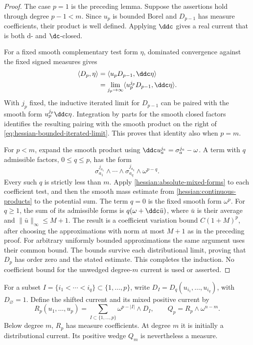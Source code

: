 \begin{proof}
The case $p=1$ is the preceding lemma. Suppose the assertions hold
through degree $p-1<m$. Since $u_p$ is bounded Borel and $D_{p-1}$
has measure coefficients, their product is well defined. Applying
$\ddc$ gives a real current that is both $\mathrm d$- and
$\dc$-closed.

For a fixed smooth complementary test form $\eta$, dominated
convergence against the fixed signed measures gives
\[
 \begin{aligned}
 \langle D_p,\eta\rangle
 &=\langle u_pD_{p-1},\ddc\eta\rangle\\
 &=\lim_{j_p\to\infty}
       \langle u_p^{j_p}D_{p-1},\ddc\eta\rangle.
 \end{aligned}
\]
With $j_p$ fixed, the inductive iterated limit for $D_{p-1}$ can be
paired with the smooth form $u_p^{j_p}\ddc\eta$. Integration by parts
for the smooth closed factors identifies the resulting pairing with
the smooth product on the right of
\eqref{eq:hessian-bounded-iterated-limit}. This proves that identity
also when $p=m$.

For $p<m$, expand the smooth product using
$\ddc u_a^{j_a}=\sigma_a^{j_a}-\omega$. A term with $q$ admissible
factors, $0\leq q\leq p$, has the form
\[
 \sigma_{a_1}^{j_{a_1}}\wedge\cdots\wedge
 \sigma_{a_q}^{j_{a_q}}\wedge\omega^{p-q}.
\]
Every such $q$ is strictly less than $m$. Apply
\cref{hessian:absolute-mixed-forms} to each coefficient test, and then
the smooth mass estimate from \cref{hessian:continuous-products} to
the potential sum. The term $q=0$ is the fixed smooth form $\omega^p$.
For $q\geq1$, the sum of its admissible forms is
$q(\omega+\ddc\bar u)$, where $\bar u$ is their average and
$\|\bar u\|_\infty\leq M+1$. The result is a
coefficient variation bound $C(1+M)^p$, after choosing the
approximations with norm at most $M+1$ as in the preceding proof.
For arbitrary uniformly bounded approximations the same argument
uses their common bound. The bounds survive each distributional
limit, proving that $D_p$ has order zero and the stated estimate.
This completes the induction. No coefficient bound for the unwedged
degree-$m$ current is used or asserted.
\end{proof}

For a subset $I=\{i_1<\cdots<i_q\}\subset\{1,\ldots,p\}$, write
$D_I=D_q(u_{i_1},\ldots,u_{i_q})$, with $D_\varnothing=1$.
Define the shifted current and its mixed positive current by
\begin{equation}\label{eq:hessian-bounded-shifted-current}
 R_p(u_1,\ldots,u_p)
 =\sum_{I\subset\{1,\ldots,p\}}\omega^{p-|I|}\wedge D_I,
 \qquad Q_p=R_p\wedge\omega^{n-m}.
\end{equation}
Below degree $m$, $R_p$ has measure coefficients. At degree $m$ it
is initially a distributional current. Its positive wedge $Q_m$ is
nevertheless a measure.

